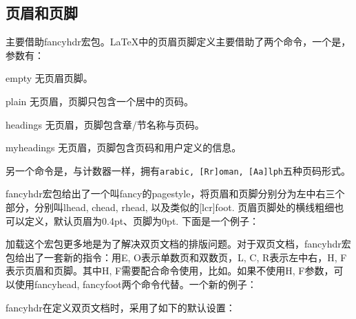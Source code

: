 {\subsection{页眉和页脚}
主要借助fancyhdr宏包。\LaTeX 中的页眉页脚定义主要借助了两个命令，一个是\latexline{\\pagestyle}，参数有：
\begin{para}
\item[empty] 无页眉页脚。
\item[plain] 无页眉，页脚只包含一个居中的页码。
\item[headings] 无页眉，页脚包含章/节名称与页码。
\item[myheadings] 无页眉，页脚包含页码和用户定义的信息。
\end{para}

另一个命令是\latexline{\\pagenumbering}，与计数器一样，拥有\texttt{arabic, [Rr]oman, [Aa]lph}五种页码形式。

fancyhdr宏包给出了一个叫fancy的pagestyle，将页眉和页脚分别分为左中右三个部分，分别叫lhead, chead, rhead, 以及类似的[lcr]foot. 页眉页脚处的横线粗细也可以定义，默认页眉为0.4pt、页脚为0pt. 下面是一个例子：
\begin{latex}{}
\usepackage{fancyhdr}
\pagestyle{fancy}
  \lhead{}
  \chead{}
  \cfoot{\thepage}
\renewcommand{\headrulewidth}{0.4pt}
\renewcommand{\footrulewidth}{0.4pt}
\end{latex}

加载这个宏包更多地是为了解决双页文档的排版问题。对于双页文档，fancyhdr宏包给出了一套新的指令：用E, O表示单数页和双数页，L, C, R表示左中右，H, F表示页眉和页脚。其中H, F需要配合\latexline{\\fancyhf}命令使用，比如。如果不使用H, F参数，可以使用fancyhead, fancyfoot两个命令代替。一个新的例子：
\begin{latex}{}
\fancyhead{} %
\fancyfoot{} %
  \fancyfoot[C]{\thepage}
\end{latex}

fancyhdr在定义双页文档时，采用了如下的默认设置：
\begin{latex}{}
\fancyhead[LE,RO]{\slshape \rightmark}
\fancyhead[LO,RE]{\slshape \leftmark}
\fancyfoot[C]{\thepage}
\end{latex}

}
